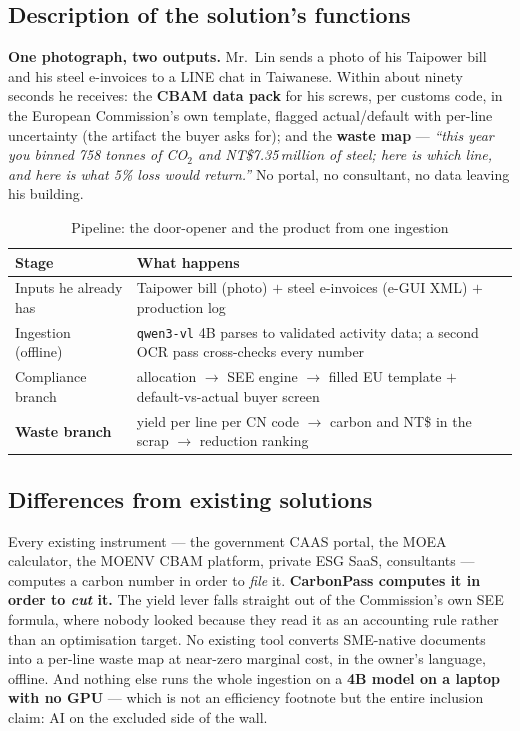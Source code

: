 \documentclass[11pt,a4paper]{article}
\newcommand{\NT}{NT\$}
\begin{document}
\subsection{Description of the solution's functions}
\textbf{One photograph, two outputs.} Mr.~Lin sends a photo of his Taipower bill and his steel e-invoices to a LINE chat in Taiwanese. Within about ninety seconds he receives: the \textbf{CBAM data pack} for his screws, per customs code, in the European Commission's own template, flagged actual/default with per-line uncertainty (the artifact the buyer asks for); and the \textbf{waste map} --- \emph{``this year you binned 758 tonnes of CO$_2$ and \NT7.35\,million of steel; here is which line, and here is what 5\% loss would return.''} No portal, no consultant, no data leaving his building.

\begin{table}[htbp]
\caption{Pipeline: the door-opener and the product from one ingestion}
\label{tab:pipe}
\small
\begin{tabularx}{\textwidth}{@{}lX@{}}
\toprule
\textbf{Stage} & \textbf{What happens} \\
\midrule
Inputs he already has & Taipower bill (photo) $+$ steel e-invoices (e-GUI XML) $+$ production log \\
Ingestion (offline) & \texttt{qwen3-vl} 4B parses to validated activity data; a second OCR pass cross-checks every number \\
Compliance branch & allocation $\to$ SEE engine $\to$ filled EU template $+$ default-vs-actual buyer screen \\
\textbf{Waste branch} & yield per line per CN code $\to$ carbon and \NT{} in the scrap $\to$ reduction ranking \\
\bottomrule
\end{tabularx}
\end{table}

\subsection{Differences from existing solutions}
Every existing instrument --- the government CAAS portal, the MOEA calculator, the MOENV CBAM platform, private ESG SaaS, consultants --- computes a carbon number in order to \emph{file} it. \textbf{CarbonPass computes it in order to \emph{cut} it.} The yield lever falls straight out of the Commission's own SEE formula, where nobody looked because they read it as an accounting rule rather than an optimisation target. No existing tool converts SME-native documents into a per-line waste map at near-zero marginal cost, in the owner's language, offline. And nothing else runs the whole ingestion on a \textbf{4B model on a laptop with no GPU} --- which is not an efficiency footnote but the entire inclusion claim: AI on the excluded side of the wall.
\end{document}

